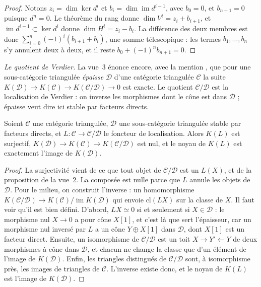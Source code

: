 \begin{proof}
Notons $z_i = \dim \ker d^i$ et $b_i = \dim \operatorname{im} d^{i-1}$, avec $b_0 = 0$, et $b_{n+1} = 0$ puisque $d^n = 0$. Le théorème du rang donne $\dim V^i = z_i + b_{i+1}$, et $\operatorname{im} d^{i-1} \subset \ker d^i$ donne $\dim H^i = z_i - b_i$. La différence des deux membres est donc $\sum_{i=0}^n (-1)^i (b_{i+1} + b_i)$, une somme télescopique : les termes $b_1, \dots, b_n$ s'y annulent deux à deux, et il reste $b_0 + (-1)^n b_{n+1} = 0$.
\end{proof}

\emph{Le quotient de Verdier.} La vue~3 énonce encore, avec la mention , que pour une sous-catégorie triangulée \emph{épaisse} $\mathcal D$ d'une catégorie triangulée $\mathcal C$ la suite $K(\mathcal D) \to K(\mathcal C) \to K(\mathcal C/\mathcal D) \to 0$ est exacte. Le quotient $\mathcal C/\mathcal D$ est la localisation de Verdier : on inverse les morphismes dont le cône est dans $\mathcal D$ ; épaisse veut dire ici stable par facteurs directs.

\begin{encadre}
\begin{enonce}
Soient $\mathcal C$ une catégorie triangulée, $\mathcal D$ une sous-catégorie triangulée stable par facteurs directs, et $L : \mathcal C \to \mathcal C/\mathcal D$ le foncteur de localisation. Alors $K(L)$ est surjectif, $K(\mathcal D) \to K(\mathcal C) \to K(\mathcal C/\mathcal D)$ est nul, et le noyau de $K(L)$ est exactement l'image de $K(\mathcal D)$.
\end{enonce}
\end{encadre}

\begin{proof}
La surjectivité vient de ce que tout objet de $\mathcal C/\mathcal D$ est un $L(X)$, et de la proposition de la vue~2. La composée est nulle parce que $L$ annule les objets de $\mathcal D$. Pour le milieu, on construit l'inverse : un homomorphisme $K(\mathcal C/\mathcal D) \to K(\mathcal C)/\operatorname{im} K(\mathcal D)$ qui envoie $\mathrm{cl}(L X)$ sur la classe de $X$. Il faut voir qu'il est bien défini. D'abord, $L X \simeq 0$ si et seulement si $X \in \mathcal D$ : le morphisme nul $X \to 0$ a pour cône $X[1]$, et c'est là que sert l'épaisseur, car un morphisme nul inversé par $L$ a un cône $Y \oplus X[1]$ dans $\mathcal D$, dont $X[1]$ est un facteur direct. Ensuite, un isomorphisme de $\mathcal C/\mathcal D$ est un toit $X \to Y' \leftarrow Y$ de deux morphismes à cône dans $\mathcal D$, et chacun ne change la classe que d'un élément de l'image de $K(\mathcal D)$. Enfin, les triangles distingués de $\mathcal C/\mathcal D$ sont, à isomorphisme près, les images de triangles de $\mathcal C$. L'inverse existe donc, et le noyau de $K(L)$ est l'image de $K(\mathcal D)$.
\end{proof}

